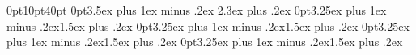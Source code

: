 \titlespacing*{\chapter}        {0pt}{10pt}{40pt}
\titlespacing*{\section}        {0pt}{3.5ex plus 1ex minus .2ex} {2.3ex plus .2ex}
\titlespacing*{\subsection}     {0pt}{3.25ex plus 1ex minus .2ex}{1.5ex plus .2ex}
\titlespacing*{\subsubsection}  {0pt}{3.25ex plus 1ex minus .2ex}{1.5ex plus .2ex}
\titlespacing*{\paragraph}      {0pt}{3.25ex plus 1ex minus .2ex}{1.5ex plus .2ex}
\titlespacing*{\subparagraph}   {0pt}{3.25ex plus 1ex minus .2ex}{1.5ex plus .2ex}

\usepackage{fancyhdr}
%
\fancyhf{} %
\fancyfoot[RO]{\thepage}
\renewcommand{\headrulewidth}{0pt}
\renewcommand{\footrulewidth}{0pt}
\pagestyle{fancy}

\setlength{\parskip}{1em} %


\makeatletter
\def\@makechapterhead#1{%
  \vspace*{50\p@}%
  {\parindent \z@ \raggedright \normalfont
    \ifnum \c@secnumdepth >\m@ne
        \huge\bfseries \space \thechapter\space
    \fi
    \interlinepenalty\@M
    \Huge \bfseries #1\par\nobreak
    \vskip 40\p@
  }}
  \makeatother

\renewcommand{\contentsname}{Table of Contents}

